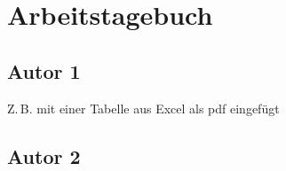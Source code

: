 \chapter{Arbeitstagebuch}
	\section{Autor 1}
		Z.\,B. mit einer Tabelle aus Excel als pdf eingefügt
	\section{Autor 2}